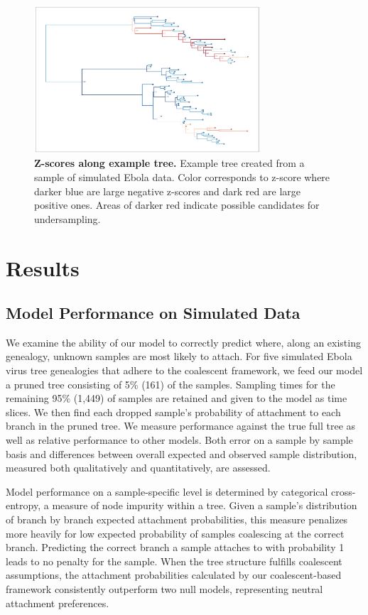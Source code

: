 \documentclass[11pt,oneside,letterpaper]{article}
\newcommand\tab[1][1cm]{\hspace*{#1}}
\begin{document}
\begin{figure}[h]
 \centering
	\includegraphics[width=0.75\textwidth]{figures/z-scores}
	\caption{\textbf{Z-scores along example tree.}
	Example tree created from a sample of simulated Ebola data. Color corresponds to z-score where darker blue are large negative z-scores and dark red are large positive ones. Areas of darker red indicate possible candidates for undersampling.
	}
	\label{F-z-scores}
\end{figure}

\section*{Results}
\subsection*{Model Performance on Simulated Data}
\tab We examine the ability of our model to correctly predict where, along an existing genealogy, unknown samples are most likely to attach. For five simulated Ebola virus tree genealogies that adhere to the coalescent framework, we feed our model a pruned tree consisting of 5\% (161) of the samples. Sampling times for the remaining 95\% (1,449) of samples are retained and given to the model as time slices. We then find each dropped sample's probability of attachment to each branch in the pruned tree. We measure performance against the true full tree as well as relative performance to other models. Both error on a sample by sample basis and differences between overall expected and observed sample distribution, measured both qualitatively and quantitatively, are assessed.

\tab Model performance on a sample-specific level is determined by categorical cross-entropy, a measure of node impurity within a tree. Given a sample's distribution of branch by branch expected attachment probabilities, this measure penalizes more heavily for low expected probability of samples coalescing at the correct branch. Predicting the correct branch a sample attaches to with probability 1 leads to no penalty for the sample. When the tree structure fulfills coalescent assumptions, the attachment probabilities calculated by our coalescent-based framework consistently outperform two null models, representing neutral attachment preferences.
\end{document}
